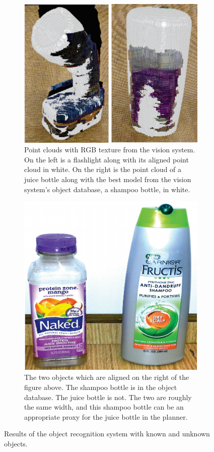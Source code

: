 \begin{figure}
\begin{subfigure}[b]{.45\columnwidth}
\centering
\includegraphics[width=.95\columnwidth]{alignment_1.png}
\caption{Point clouds with RGB texture from the vision system. On the left is a flashlight along with its aligned point cloud in white. On the right is the point cloud of a juice bottle along with the best model from the vision system’s object database, a shampoo bottle, in white.}
\label{fig:alignment_1}
\end{subfigure}
\begin{subfigure}[b]{.45\columnwidth}
\centering
\includegraphics[height=0.95\columnwidth]{unknown_objects_1.png}
\caption{The two objects which are aligned on the right of the figure above. The shampoo bottle is in the object database. The juice bottle is not. The two are roughly the same width, and this shampoo bottle can be an appropriate proxy for the juice bottle in the planner.}
\label{fig:unknown_objects_1}
\end{subfigure}
\caption{Results of the object recognition system with known and unknown objects.}
\end{figure}


